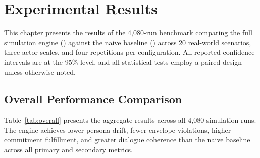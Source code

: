 \chapter{Experimental Results}

This chapter presents the results of the 4,080-run benchmark comparing the full simulation engine (\engine) against the naive baseline (\naive) across 20 real-world scenarios, three actor scales, and four repetitions per configuration. All reported confidence intervals are at the 95\% level, and all statistical tests employ a paired design unless otherwise noted.


\section{Overall Performance Comparison}

Table~\ref{tab:overall} presents the aggregate results across all 4,080 simulation runs. The engine achieves lower persona drift, fewer envelope violations, higher commitment fulfillment, and greater dialogue coherence than the naive baseline across all primary and secondary metrics.

